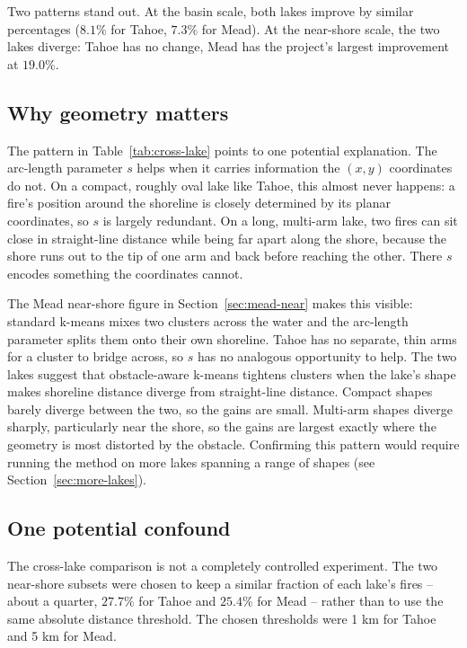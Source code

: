 \documentclass[11pt]{article}
\begin{document}
Two patterns stand out. At the basin scale, both lakes improve by similar percentages ($8.1\%$ for Tahoe, $7.3\%$ for Mead).  At the near-shore scale, the two lakes diverge: Tahoe has no change, Mead has the project's largest improvement at $19.0\%$. 
 
\subsection{Why geometry matters}
 
The pattern in Table~\ref{tab:cross-lake} points to one potential explanation. The arc-length parameter $s$ helps when it carries information the $(x, y)$ coordinates do not. On a compact, roughly oval lake like Tahoe, this almost never happens: a fire's position around the shoreline is closely determined by its planar coordinates, so $s$ is largely redundant. On a long, multi-arm lake, two fires can sit close in straight-line distance while being far apart along the shore, because the shore runs out to the tip of one arm and back before reaching the other. There $s$ encodes something the coordinates cannot.
 
The Mead near-shore figure in Section~\ref{sec:mead-near} makes this visible: standard k-means mixes two clusters across the water and the arc-length parameter splits them onto their own shoreline. Tahoe has no separate, thin arms for a cluster to bridge across, so $s$ has no analogous opportunity to help.  The two lakes suggest that obstacle-aware k-means tightens clusters when the lake's shape makes shoreline distance diverge from straight-line distance. Compact shapes barely diverge between the two, so the gains are small. Multi-arm shapes diverge sharply, particularly near the shore, so the gains are largest exactly where the geometry is most distorted by the obstacle. Confirming this pattern would require running the method on more lakes spanning a range of shapes (see Section~\ref{sec:more-lakes}).
 
\subsection{One potential confound}
 
The cross-lake comparison is not a completely controlled experiment. The two near-shore subsets were chosen to keep a similar fraction of each lake's fires -- about a quarter, $27.7\%$ for Tahoe and $25.4\%$ for Mead -- rather than to use the same absolute distance threshold. The chosen thresholds were 1 km for Tahoe and 5 km for Mead.
 
\end{document}
